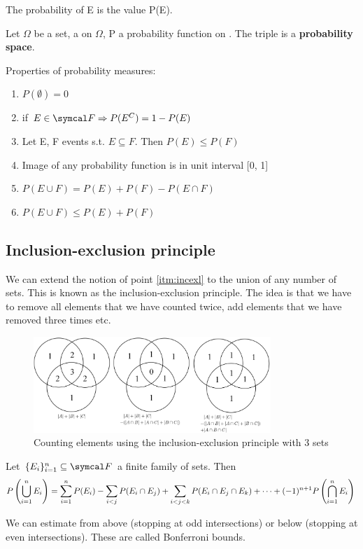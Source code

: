 The probability of E is the value P(E).
\begin{definition}
    Let $\Omega$ be a set, \eff{} a \sigal{} on $\Omega$, P a probability function on \eff. The triple \probspace{} is a \textbf{probability space}.
\end{definition}
Properties of probability measures:
\begin{enumerate}
    \item $P(\emptyset) = 0$
    \item if $E \in \eff \Rightarrow P(E^C) = 1 - P(E)$
    \item Let E, F events s.t. $E \subseteq F$. Then $P(E) \le P(F)$
    \item Image of any probability function is in unit interval [0, 1]
    \item \label{itm:incexl} $P(E \cup F) = P(E) + P(F) - P(E \cap F)$
    \item $P(E \cup F) \le P(E) + P(F)$
\end{enumerate}
\subsection{Inclusion-exclusion principle}
We can extend the notion of point \ref{itm:incexl} to the union of any number of sets. This is known as the inclusion-exclusion principle.
The idea is that we have to remove all elements that we have counted twice, add elements that we have removed three times etc.
\begin{figure}[ht]
    \centering
    \includegraphics[width=0.8\textwidth]{images/Inclusion-exclusion-3sets.png}
    \caption*{Counting elements using the inclusion-exclusion principle with 3 sets}
\end{figure}
\begin{proposition}
    Let $\{E_i\}_{i=1}^n \subseteq \eff$  a finite family of sets. Then
    \begin{equation*}
        P\left(\bigcup_{i=1}^{n} E_i\right) = 
        \sum_{i=1}^nP(E_i) -
        \sum_{i<j}P(E_i \cap E_j) +
        \sum_{i<j<k}P(E_i \cap E_j \cap E_k) +
        \cdots +
        (-1)^{n+1}P\left(\bigcap_{i=1}^nE_i\right)
        \blfootnote{$\sum_{i<j}=\sum_{i=1}^n\left(\sum_{j=i+1}^nP(E_i \cap E_j\right)$}
    \end{equation*}
\end{proposition}
\begin{remark}
We can estimate from above (stopping at odd intersections) or below (stopping at even intersections). These are called Bonferroni bounds.
\end{remark}
